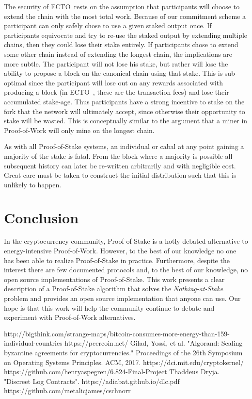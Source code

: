 \documentclass{article}
\newcommand{\coin}{ \textsc{ECTO}\ }
\begin{document}
The security of \coin rests on the assumption that participants will choose to extend the chain with the most total work. Because of our commitment scheme a participant can only safely chose to use a given staked output once. If participants equivocate and try to re-use the staked output by extending multiple chains, then they could lose their stake entirely. If participants chose to extend some other chain instead of extending the longest chain, the implications are more subtle. The participant will not lose his stake, but rather will lose the ability to propose a block on the canonical chain using that stake. This is sub-optimal since the participant will lose out on any rewards associated with producing a block (in \coin, these are the transaction fees) and lose their accumulated stake-age. Thus participants have a strong incentive to stake on the fork that the network will ultimately accept, since otherwise their opportunity to stake will be wasted. This is conceptually similar to the argument that a miner in Proof-of-Work will only mine on the longest chain. 

As with all Proof-of-Stake systems, an individual or cabal at any point gaining a majority of the stake is fatal. From the block where a majority is possible all subsequent history can later be re-written arbitrarily and with negligible cost. Great care must be taken to construct the initial distribution such that this is unlikely to happen.

\section{Conclusion}
In the cryptocurrency community, Proof-of-Stake is a hotly debated alternative to energy-intensive Proof-of-Work. However, to the best of our knowledge no one has been able to realize Proof-of-Stake in practice. Furthermore, despite the interest there are few documented protocols and, to the best of our knowledge, no open source implementations of Proof-of-Stake. This work presents a clear description of a Proof-of-Stake algorithm that solves the \textit{Nothing-at-Stake} problem and provides an open source implementation that anyone can use. Our hope is that this work will help the community continue to debate and experiment with Proof-of-Work alternatives.    


\begin{thebibliography}{9}
http://bigthink.com/strange-maps/bitcoin-consumes-more-energy-than-159-individual-countries
https://peercoin.net/
Gilad, Yossi, et al. "Algorand: Scaling byzantine agreements for cryptocurrencies." Proceedings of the 26th Symposium on Operating Systems Principles. ACM, 2017.
https://dci.mit.edu/cryptokernel/
https://github.com/henryaspegren/6.824-Final-Project
 Thaddeus Dryja. "Discreet Log Contracts". https://adiabat.github.io/dlc.pdf
 https://github.com/metalicjames/cschnorr
\end{thebibliography}
\end{document}
